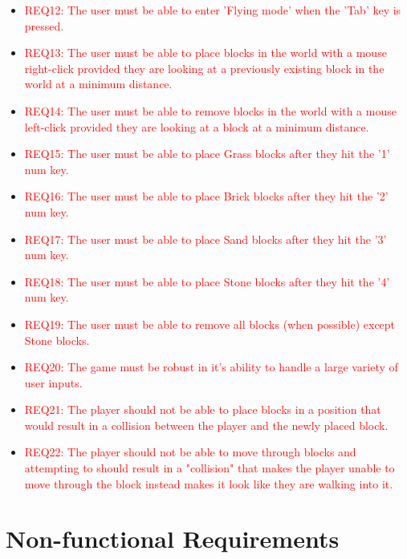 \documentclass[12pt, titlepage]{article}
\begin{document}
\begin{itemize}
    \item \textcolor{red}{REQ12: The user must be able to enter 'Flying mode' when the 'Tab' key is pressed.}
    \item \textcolor{red}{REQ13: The user must be able to place blocks in the world with a mouse right-click provided they are looking at a previously existing block in the world at a minimum distance.}
    \item \textcolor{red}{REQ14: The user must be able to remove blocks in the world with a mouse left-click provided they are looking at a block at a minimum distance.}
    \item \textcolor{red}{REQ15: The user must be able to place Grass blocks after they hit the '1' num key.}
    \item \textcolor{red}{REQ16: The user must be able to place Brick blocks after they hit the '2' num key.}
    \item \textcolor{red}{REQ17: The user must be able to place Sand blocks after they hit the '3' num key.}
    \item \textcolor{red}{REQ18: The user must be able to place Stone blocks after they hit the '4' num key.}
    \item \textcolor{red}{REQ19: The user must be able to remove all blocks (when possible) except Stone blocks.}
    \item \textcolor{red}{REQ20: The game must be robust in it's ability to handle a large variety of user inputs.}
    \item \textcolor{red}{REQ21: The player should not be able to place blocks in a position that would result in a collision between the player and the newly placed block.}
    \item \textcolor{red}{REQ22: The player should not be able to move through blocks and attempting to should result in a "collision" that makes the player unable to move through the block instead makes it look like they are walking into it.}
\end{itemize}


\section{Non-functional Requirements}
\end{document}
